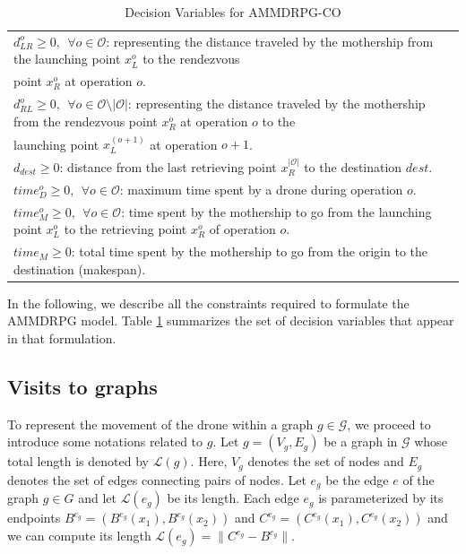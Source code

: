 \documentclass[10pt,a4paper]{elsarticle}
\def\AMD{{\sf AMMDRPG\xspace}}
\newcommand{\EN}[1]{{\color{black}#1}}
\begin{document}
\begin{table}[h!]
\begin{tabular}{|l|}
	$d_{LR}^o \geq 0, \:\: \forall o \in \mathcal O$: representing the distance traveled by the mothership from the launching point $x_L^o$ to the rendezvous\\
	\hspace*{1cm}   point $x_R^o$ at operation $o$.\\
	$d_{RL}^o \geq 0, \:\: \forall o \in \mathcal O\setminus |\mathcal O|$: representing the distance traveled by the mothership from the rendezvous point $x_R^o$ at operation $o$ to the \\ 
	\hspace*{1cm}  launching point $x_L^{(o+1)}$ at operation $o+1$.\\
	$d_{dest}\geq 0$: distance from the last retrieving point $x_R^{|\mathcal O|}$ to the destination $dest$.\\
	
	$time_D^o \geq 0, \:\: \forall o \in \mathcal O$: maximum time spent by a drone during operation $o$.\\
	$time_M^o \geq 0, \:\: \forall o \in \mathcal O$: time spent by the mothership to go from the launching point $x_L^o$ to the retrieving point $x_R^o$ of operation $o$.\\
	$time_M \geq 0$: total time spent by the mothership to go from the origin to the destination (makespan).\\
	\hline
\end{tabular}
\caption{Decision Variables for AMMDRPG-CO}
\label{table:t2}
\end{table}

\noindent
In the following, we describe all the constraints required to formulate the \AMD\xspace model. Table \ref{table:t2} summarizes the set of decision variables that appear in that formulation.
\subsection*{Visits \EN{to} graphs}
\noindent
To represent the movement of the drone within a graph $g\in\mathcal G$, we proceed to introduce some notation\EN{s} related to $g$.
Let $g = (V_g, E_g)$ be a graph in $\mathcal G$ whose total length is denoted by $\mathcal L(g)$. Here, $V_g$ denotes the set of nodes and $E_g$ denotes the set of edges connecting pairs of nodes.  Let $e_g$ be the edge $e$ of the graph $g \in G$ and let $\mathcal  L(e_g)$ be its length. Each edge $e_g$ is parameterized by its endpoints $B^{e_g}= (B^{e_g}(x_1), B^{e_g}(x_2))$ and $C^{e_g}= (C^{e_g}(x_1), C^{e_g}(x_2))$ and we can compute its length $\mathcal L(e_g) =\|C^{e_g} -  B^{e_g}\|$. 
\end{document}
